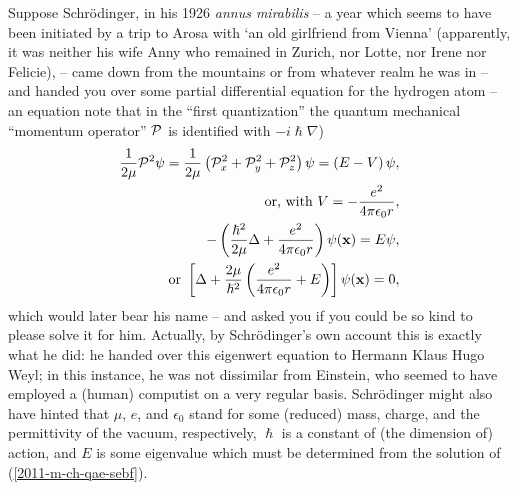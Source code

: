 Suppose Schr\"odinger, in his 1926 {\it annus mirabilis}
--
a year
which seems to have been initiated by a trip to Arosa with `an old girlfriend from Vienna'
(apparently, it was neither his wife Anny who remained in Zurich, nor Lotte, nor Irene nor Felicie\cite{Moore-Schroedinger}),
--
came down from the mountains or from whatever realm he was in -- and
handed you over some partial differential equation  for the hydrogen atom
-- an equation
note that in the ``first quantization''  the quantum mechanical ``momentum operator'' ${\cal P}$ is identified with  $- i \hslash \nabla$)
\begin{equation}
\begin{split}
  \frac{1}{2\mu } {\cal P} ^2  \psi =\frac{1}{2\mu }\left({\cal P}_x^2 +{\cal P}_y^2 +{\cal P}_z^2\right) \psi = \left( E-V \right)\psi ,\\
\textrm{  or, with } V=-\frac{e^2}{4\pi \epsilon_0 r}, \\
 -\left( \frac{\hslash^2}{2\mu }\Delta +  \frac{e^2}{4\pi \epsilon_0r} \right)\psi ({\bf x})= E\psi, \\
 \textrm{ or }\left[ \Delta + \frac{2\mu }{\hslash^2} \left(\frac{e^2}{4\pi \epsilon_0r} + E \right)\right]\psi ({\bf x})=0,
\end{split}
\label{2011-m-ch-qae-sebf}
\end{equation}
which would later bear his name  -- and asked you if you could be so kind to please solve it for him.
Actually, by Schr\"odinger's own account\cite[-30mm]{ANDP:ANDP19263840404} this is exactly what he did:
he handed  over this eigenwert equation to Hermann Klaus Hugo Weyl;
in this instance, he was not dissimilar from Einstein, who seemed to have employed a (human) computist on a very regular basis.
Schr\"odinger might also have hinted that $\mu$, $e$, and $\epsilon_0$ stand for some
(reduced) mass,
charge, and the  permittivity of the vacuum, respectively,
$\hslash$ is a constant of (the dimension of) action,
and $E$ is some eigenvalue which must be determined from
the solution of (\ref{2011-m-ch-qae-sebf}).

